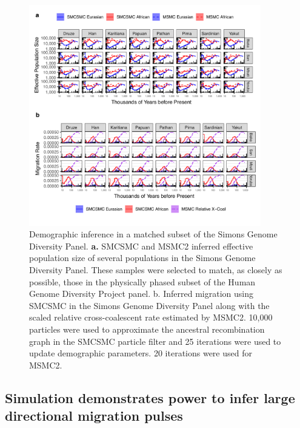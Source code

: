 \begin{figure}
  \centering
  \includegraphics[width=0.9\textwidth]{plot/subset_ne_mig.pdf}
  \caption[Demographic inference in a matched subset of the SGDP]{ Demographic inference in a matched subset of the Simons Genome Diversity Panel. {\bf a.} SMCSMC and MSMC2 inferred effective population size of several populations in the Simons Genome Diversity Panel. These samples were selected to match, as closely as possible, those in the physically phased subset of the Human Genome Diversity Project panel. {b.} Inferred migration using SMCSMC in the Simons Genome Diversity Panel along with the scaled relative cross-coalescent rate estimated by MSMC2.  10,000 particles were used to approximate the ancestral recombination graph in the SMCSMC particle filter and 25 iterations were used to update demographic parameters. 20 iterations were used for MSMC2.}
  \label{fig:hgdp_sgdp}
\end{figure}

\subsection{Simulation demonstrates power to infer large directional migration pulses}

